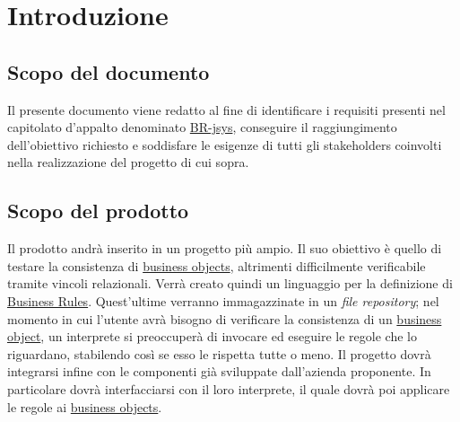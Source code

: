 \tableofcontents

\chapter{Introduzione}
\section{Scopo del documento}
Il presente documento viene redatto al fine di identificare i requisiti presenti nel capitolato d'appalto denominato \underline{BR-jsys}, conseguire il raggiungimento dell'obiettivo richiesto e soddisfare le esigenze di tutti gli stakeholders coinvolti nella realizzazione del progetto di cui sopra.
\section{Scopo del prodotto}
Il prodotto andr\`a inserito in un progetto pi\`u ampio. Il suo obiettivo \`e quello di testare la consistenza di \underline{business objects}, altrimenti difficilmente verificabile tramite vincoli relazionali.
Verr\`a creato quindi un linguaggio per la definizione di \underline{Business Rules}. Quest'ultime verranno immagazzinate in un \textit{file repository}; nel momento in cui l'utente avr\`a bisogno di verificare la consistenza di un \underline{business object}, un interprete si preoccuper\`a di invocare ed eseguire le regole che lo riguardano, stabilendo cos\`i se esso le rispetta tutte o meno.
Il progetto dovr\`a integrarsi infine con le componenti gi\`a sviluppate dall'azienda proponente. In particolare dovr\`a interfacciarsi con il loro interprete, il quale dovr\`a poi applicare le regole ai \underline{business objects}.
